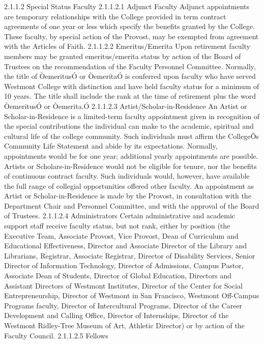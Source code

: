 \documentclass[letterpaper, 11pt]{article}
\begin{document}
	2.1.1.2 Special Status Faculty
	2.1.1.2.1 Adjunct Faculty
	Adjunct appointments are temporary relationships with the College provided in term contract agreements of one year or less which specify the benefits granted by the College. These faculty, by special action of the Provost, may be exempted from agreement with the Articles of Faith.
	2.1.1.2.2 Emeritus/Emerita
	Upon retirement faculty members may be granted emeritus/emerita status by action of the Board of Trustees on the recommendation of the Faculty Personnel Committee.  Normally, the title of ÒemeritusÓ or ÒemeritaÓ is conferred upon faculty who have served Westmont College with distinction and have held faculty status for a minimum of 10 years.  The title shall include the rank at the time of retirement plus the word ÒemeritusÓ or Òemerita.Ó
	2.1.1.2.3 Artist/Scholar-in-Residence
	An Artist or Scholar-in-Residence is a limited-term faculty appointment given in recognition of the special contributions the individual can make to the academic, spiritual and cultural life of the college community.  Such individuals must affirm the CollegeÕs Community Life Statement and abide by its expectations.  Normally, appointments would be for one year; additional yearly appointments are possible.  Artists or Scholars-in-Residence would not be eligible for tenure, nor the benefits of continuous contract faculty. Such individuals would, however, have available the full range of collegial opportunities offered other faculty.  An appointment as Artist or Scholar-in-Residence is made by the Provost, in consultation with the Department Chair and Personnel Committee, and with the approval of the Board of Trustees.
	2.1.1.2.4 Administrators
	Certain administrative and academic support staff receive faculty status, but not rank, either by position (the Executive Team, Associate Provost, Vice Provost, Dean of Curriculum and Educational Effectiveness, Director and Associate Director of the Library and Librarians, Registrar, Associate Registrar, Director of Disability Services, Senior Director of Information Technology, Director of Admissions, Campus Pastor, Associate Dean of Students, Director of Global Education, Directors and Assistant Directors of Westmont Institutes, Director of the Center for Social Entrepreneurship, Director of Westmont in San Francisco, Westmont Off-Campus Programs faculty, Director of Intercultural Programs, Director of the Career Development and Calling Office, Director of Internships, Director of the Westmont Ridley-Tree Museum of Art, Athletic Director) or by action of the Faculty Council.
	2.1.1.2.5 Fellows
\end{document}

